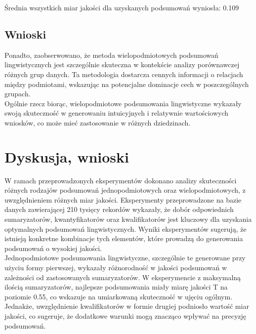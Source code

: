 \documentclass{article}
\begin{document}
\noindent Średnia wszystkich miar jakości dla uzyskanych podsumowań wyniosła: 0.109


\subsection{Wnioski}

\noindent Ponadto, zaobserwowano, że metoda wielopodmiotowych podsumowań lingwistycznych jest szczególnie skuteczna w kontekście analizy porównawczej różnych grup danych. Ta metodologia dostarcza cennych informacji o relacjach między podmiotami, wskazując na potencjalne dominacje cech w poszczególnych grupach. \\

\noindent Ogólnie rzecz biorąc, wielopodmiotowe podsumowania lingwistyczne wykazały swoją skuteczność w generowaniu intuicyjnych i relatywnie wartościowych wniosków, co może mieć zastosowanie w różnych dziedzinach.


\section{Dyskusja, wnioski}

W ramach przeprowadzonych eksperymentów dokonano analizy skuteczności różnych rodzajów podsumowań jednopodmiotowych oraz wielopodmiotowych, z uwzględnieniem różnych miar jakości. Eksperymenty przeprowadzone na bazie danych zawierającej 210 tysięcy rekordów wykazały, że dobór odpowiednich sumaryzatorów, kwantyfikatorów oraz kwalifikatorów jest kluczowy dla uzyskania optymalnych podsumowań lingwistycznych. Wyniki eksperymentów sugerują, że istnieją konkretne kombinacje tych elementów, które prowadzą do generowania podsumowań o wysokiej jakości. \\

\noindent Jednopodmiotowe podsumowania lingwistyczne, szczególnie te generowane przy użyciu formy pierwszej, wykazały różnorodność w jakości podsumowań w zależności od zastosowanych sumaryzatorów. W eksperymencie z maksymalną ilością sumaryzatorów, najlepsze podsumowania miały miarę jakości T na poziomie 0.55, co wskazuje na umiarkowaną skuteczność w ujęciu ogólnym. Jednakże, uwzględnienie kwalifikatorów w formie drugiej podniosło wartość miar jakości, co sugeruje, że dodatkowe warunki mogą znacząco wpływać na precyzję podsumowań. \\
\end{document}
